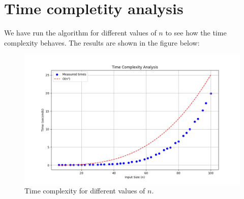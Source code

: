 \section{Time completity analysis}

We have run the algorithm for different values of $n$ to see how the time complexity behaves.
The results are shown in the figure below:

\begin{figure}[H]
    \centering
    \includegraphics[width=1\textwidth]{figuras/time_complexity.png}
    \caption{Time complexity for different values of $n$.}
    \label{fig:time_complexity}
\end{figure}
